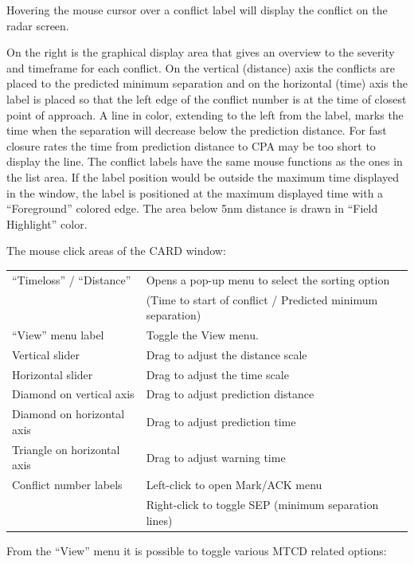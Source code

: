 \documentclass[11pt,a4paper]{memoir}
\newcommand{\colorref}[1]{\textit{\hyperref[#1]{\StrDel{#1}{color:}}}}
\begin{document}
Hovering the mouse cursor over a conflict label will display the conflict on the radar screen.

On the right is the graphical display area that gives an overview to the severity and timeframe for each conflict. On the vertical (distance) axis the conflicts are placed to the predicted minimum separation and on the horizontal (time) axis the label is placed so that the left edge of the conflict number is at the time of closest point of approach. A line in \colorref{color:CARD Time Vector} color, extending to the left from the label, marks the time when the separation will decrease below the prediction distance. For fast closure rates the time from prediction distance to CPA may be too short to display the line. The conflict labels have the same mouse functions as the ones in the list area. If the label position would be outside the maximum time displayed in the window, the label is positioned at the maximum displayed time with a “Foreground” colored edge.
The area below 5nm distance is drawn in “Field Highlight” color.

The mouse click areas of the CARD window:

\begin{tabular}{l l}
    “Timeloss” / “Distance”     & Opens a pop-up menu to select the sorting option\\
                                & (Time to start of conflict / Predicted minimum separation)\\
    “View” menu label           & Toggle the View menu.\\
    Vertical slider             & Drag to adjust the distance scale\\
    Horizontal slider           & Drag to adjust the time scale\\
    Diamond on vertical axis    & Drag to adjust prediction distance    \\
    Diamond on horizontal axis  & Drag to adjust prediction time\\
    Triangle on horizontal axis & Drag to adjust warning time\\
    Conflict number labels      & Left-click to open Mark/ACK menu\\
                                & Right-click to toggle SEP (minimum separation lines)\\
\end{tabular}

From the “View” menu it is possible to toggle various MTCD related options:
\end{document}
